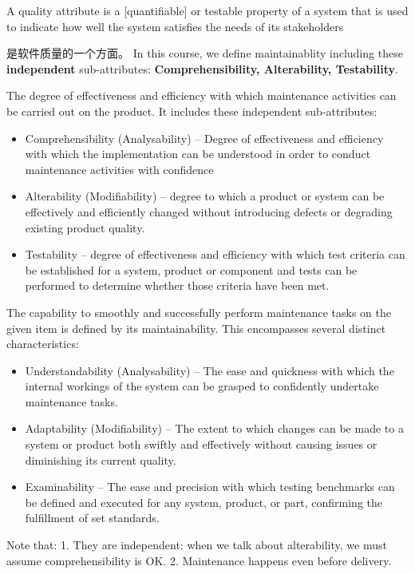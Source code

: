 \documentclass[]{ctexbook}
\newcommand{\citebox}[1]{
    \begin{center}
    \begin{tcolorbox}[colback=gray!10,%
                      colframe=black,%
                      width=15cm,%
                      arc=1mm, auto outer arc,
                      boxrule=0.5pt,
                     ]
    #1
    \end{tcolorbox}
    \end{center}
}
\begin{document}
\citebox{A quality attribute is a [quantifiable] or testable property of a system that is used to indicate how well the system satisfies the needs of its stakeholders}

是软件质量的一个方面。 In this course, we define maintainablity including these \textbf{independent} sub-attributes: \textbf{Comprehensibility, Alterability, Testability}.

\citebox{
    The degree of effectiveness and efficiency with which maintenance activities can be carried out on the product. It includes these independent sub-attributes:
    \begin{itemize}
        \item Comprehensibility (Analysability) -- Degree of effectiveness and efficiency with which the implementation can be understood in order to conduct maintenance activities with confidence
        \item Alterability (Modifiability) -- degree to which a product or system can be effectively and efficiently changed without introducing defects or degrading existing product quality.
        \item Testability -- degree of effectiveness and efficiency with which test criteria can be established for a system, product or component and tests can be performed to determine whether those criteria have been met.
    \end{itemize}
    The capability to smoothly and successfully perform maintenance tasks on the given item is defined by its maintainability. This encompasses several distinct characteristics:
    \begin{itemize}
        \item Understandability (Analysability) -- The ease and quickness with which the internal workings of the system can be grasped to confidently undertake maintenance tasks.
        \item Adaptability (Modifiability) -- The extent to which changes can be made to a system or product both swiftly and effectively without causing issues or diminishing its current quality.
        \item Examinability -- The ease and precision with which testing benchmarks can be defined and executed for any system, product, or part, confirming the fulfillment of set standards.
    \end{itemize}
}

Note that: 1. They are independent: when we talk about alterability, we must assume comprehensibility is OK. 2. Maintenance happens even before delivery.
\end{document}
